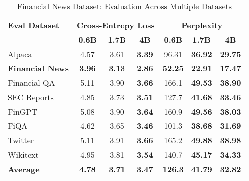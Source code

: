 
\begin{table}[h]
\centering
\caption[Financial News: Evaluation Results]{Financial News Dataset: Evaluation Across Multiple Datasets}
\label{tab:news_articles_results}
\begin{tabular}{l|ccc|ccc}
\hline
\textbf{Eval Dataset} & \multicolumn{3}{c|}{\textbf{Cross-Entropy Loss}} & \multicolumn{3}{c}{\textbf{Perplexity}} \\
\cline{2-4} \cline{5-7}
  & \textbf{0.6B} & \textbf{1.7B} & \textbf{4B} & \textbf{0.6B} & \textbf{1.7B} & \textbf{4B} \\
\hline
Alpaca & 4.57 & 3.61 & \textbf{3.39} & 96.31 & \textbf{36.92} & \textbf{29.75} \\
\textbf{Financial News} & \textbf{3.96} & \textbf{3.13} & \textbf{2.86} & \textbf{52.25} & \textbf{22.91} & \textbf{17.47} \\
Financial QA & 5.11 & 3.90 & \textbf{3.66} & 166.1 & \textbf{49.53} & \textbf{38.90} \\
SEC Reports & 4.85 & 3.73 & \textbf{3.51} & 127.7 & \textbf{41.68} & \textbf{33.46} \\
FinGPT & 5.08 & 3.90 & \textbf{3.64} & 160.9 & \textbf{49.56} & \textbf{38.03} \\
FiQA & 4.62 & 3.65 & \textbf{3.46} & 101.3 & \textbf{38.68} & \textbf{31.69} \\
Twitter & 5.11 & 3.91 & \textbf{3.66} & 165.2 & \textbf{49.88} & \textbf{38.98} \\
Wikitext & 4.95 & 3.81 & \textbf{3.54} & 140.7 & \textbf{45.17} & \textbf{34.33} \\
\hline
\textbf{Average} & \textbf{4.78} & \textbf{3.71} & \textbf{3.47} & \textbf{126.3} & \textbf{41.79} & \textbf{32.82} \\
\hline
\end{tabular}
\end{table}
